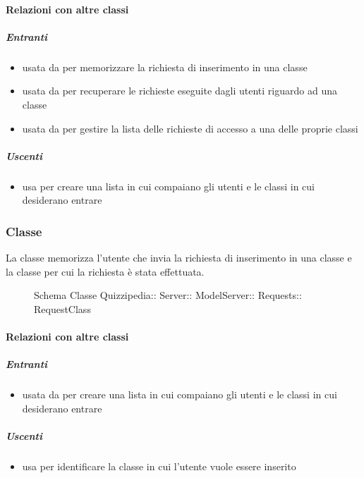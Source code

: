 \paragraph{Relazioni con altre classi}
\subparagraph{Entranti}
\begin{itemize}
\item usata da  per memorizzare la richiesta di inserimento in una classe
\item usata da  per recuperare le richieste eseguite dagli utenti riguardo ad una classe
\item usata da  per gestire la lista delle richieste di accesso a una delle proprie classi
\end{itemize}
\subparagraph{Uscenti}
\begin{itemize}
\item usa  per creare una lista in cui compaiano gli utenti e le classi in cui desiderano entrare
\end{itemize}
\subsubsection{Classe }
La classe memorizza l'utente che invia la richiesta di inserimento in una classe e la classe per cui la richiesta è stata effettuata.
\begin{figure}[H]
\centering
\noindent{}
\caption[Schema Classe RequestClass]{Schema Classe Quizzipedia:: Server:: ModelServer:: Requests:: RequestClass}
\end{figure}
\paragraph{Relazioni con altre classi}
\subparagraph{Entranti}
\begin{itemize}
\item usata da  per creare una lista in cui compaiano gli utenti e le classi in cui desiderano entrare
\end{itemize}
\subparagraph{Uscenti}
\begin{itemize}
\item usa  per identificare la classe
in cui l'utente vuole essere inserito
\end{itemize}

